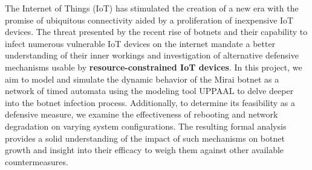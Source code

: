 The Internet of Things (IoT) has stimulated the creation of a new era with the promise of ubiquitous connectivity aided by a proliferation of inexpensive IoT devices. The threat presented by the recent rise of botnets and their capability to infect numerous vulnerable IoT devices on the internet mandate a better understanding of their inner workings and investigation of alternative defensive mechanisms usable by \textbf{resource-constrained IoT devices}. In this project, we aim to model and simulate the dynamic behavior of the Mirai botnet as a network of timed automata using the modeling tool UPPAAL to delve deeper into the botnet infection process. Additionally, to determine its feasibility as a defensive measure, we examine the effectiveness of rebooting and network degradation on varying system configurations. The resulting formal analysis provides a solid understanding of the impact of such mechanisms on botnet growth and insight into their efficacy to weigh them against other available countermeasures.





